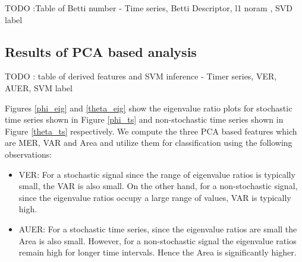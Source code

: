\documentclass[journal]{IEEEtran}
\begin{document}

TODO :Table of Betti number - Time series, Betti Descriptor, l1 noram , SVD label

\subsection{Results of PCA based analysis}

TODO : table of derived features and SVM inference - Timer series, VER, AUER, SVM label

%

Figures \ref{phi_eig} and \ref{theta_eig} show the eigenvalue ratio plots for stochastic time series shown in Figure \ref{phi_ts} and  non-stochastic time series shown in Figure \ref{theta_ts} respectively. We compute the three PCA based features which are MER, VAR and Area  and utilize them for classification using the following observations:

\begin{itemize}
\item VER: For a stochastic signal since the range of eigenvalue ratios is typically small, the VAR is also small. On the other hand, for a non-stochastic signal, since the eigenvalue ratios occupy a large range of values, VAR is typically high.
\item AUER: For a stochastic time series, since the eigenvalue ratios  are small the Area is also small. However, for a non-stochastic signal the eigenvalue ratios remain high for longer time intervals. Hence the Area is significantly higher.
\end{itemize}
\end{document}
